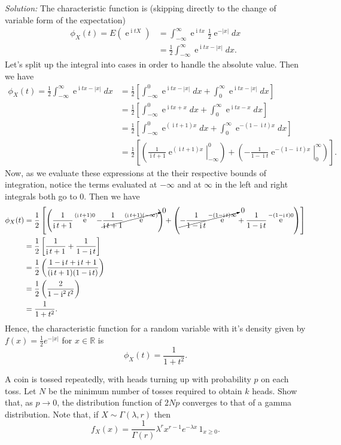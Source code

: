 \documentclass[10pt]{amsart}
\DeclareMathOperator{\E}{e}
\DeclareMathOperator{\I}{i}
\begin{document}
\noindent
\textit{Solution:}
The characteristic function is (skipping directly to the change of variable form of the expectation)
\begin{align*}
\phi_X(t) = E(\E^{\I tX}) &= \int_{-\infty}^\infty \E^{\I tx} \frac 1 2 \E^{-|x|} dx \\
	&= \frac 1 2 \int_{-\infty}^\infty \E^{\I tx - |x|} dx.
\end{align*}
Let's split up the integral into cases in order to handle the absolute value.
Then we have
\begin{align*}
\phi_X(t) = \frac 1 2 \int_{-\infty}^\infty \E^{\I tx - |x|} dx
	&= \frac 1 2 \left[ \int_{-\infty}^0 \E^{\I tx - |x|} dx + \int_0^\infty \E^{\I tx - |x|} dx \right] \\
	&= \frac 1 2 \left[ \int_{-\infty}^0 \E^{\I tx + x} dx + \int_0^\infty \E^{\I tx - x} dx \right] \\
	&= \frac 1 2 \left[ \int_{-\infty}^0 \E^{(\I t + 1)x} dx + \int_0^\infty \E^{-(1- \I t ) x} dx \right] \\
	&= \frac 1 2 \left[ \left( \left. \frac 1 {\I t + 1} \E^{(\I t + 1)x} \right|_{-\infty}^0 \right)
		+ \left( \left. - \frac 1 {1- \I t} \E^{-(1- \I t) x} \right|_0^\infty \right) \right].
\end{align*}
Now, as we evaluate these expressions at the their respective bounds of integration, notice the terms evaluated at $-\infty$ and at $\infty$ in the left and right integrals both go to 0.
Then we have
\begin{align*}
\phi_X(t) &= \frac 1 2 \left[ \left( \frac 1 {\I t + 1} \E^{(\I t + 1)0} - \cancelto{0}{\frac 1 {\I t + 1} \E^{(\I t + 1)(-\infty)}} \right)
		+ \left( \cancelto{0}{- \frac 1 {1- \I t} \E^{-(1- \I t) \infty}} + \frac 1 {1- \I t} \E^{-(1- \I t) 0} \right) \right] \\
	&= \frac 1 2 \left[ \frac 1 {\I t + 1} + \frac 1 {1- \I t} \right] \\
	&= \frac 1 2 \left( \frac {1- \I t + \I t + 1} {(\I t + 1)(1- \I t)} \right) \\
	&= \frac 1 2 \left( \frac {2} {1 - \I^2 t^2} \right) \\
	&= \frac 1 {1 + t^2} .
\end{align*}
Hence, the characteristic function for a random variable with it's density given by $f(x)=\frac{1}{2}e^{-|x|}$ for $x\in \mathds{R}$ is
$$ \phi_X(t) = \frac 1 {1 + t^2}. $$

\newpage

 A coin is tossed repeatedly, with heads turning up with probability $p$ on each toss. Let $N$ be the minimum number of tosses required to obtain $k$ heads. Show that, as $p \to 0$, the distribution function of $2Np$ converges to that of a gamma distribution. Note that, if $X \sim \Gamma(\lambda, r )$ then
$$f_X(x) = \frac{1}{\Gamma(r)} \lambda^r x^{r-1} e^{-\lambda x} \, 1_{x \geq 0}.$$
\end{document}
